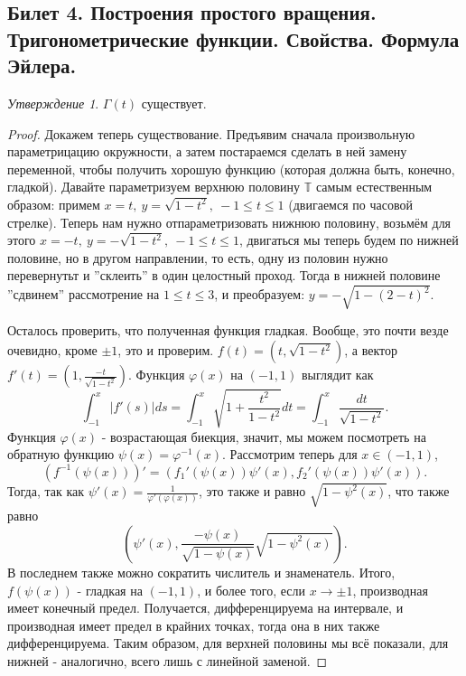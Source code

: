 \documentclass[a4paper]{article}
\theoremstyle{indented}
\theoremstyle{definition}
\theoremstyle{remark}
\newtheorem{stat}{Утверждение}
\begin{document}
\subsection{Билет 4. Построения простого вращения. Тригонометрические функции. Свойства. Формула Эйлера.}


\begin{stat}
     $\Gamma(t)$ существует.
\end{stat}

\begin{proof}
    Докажем теперь существование. Предъявим сначала произвольную параметрицацию окружности, а затем постараемся сделать в ней замену переменной, чтобы получить хорошую функцию (которая должна быть, конечно, гладкой). Давайте параметризуем верхнюю половину $\mathbb{T}$ самым естественным образом: примем $x=t, \: y=\sqrt{1-t^2}, \ -1\leq t\leq 1$ (двигаемся по часовой стрелке). Теперь нам нужно отпараметризовать нижнюю половину, возьмём для этого $x=-t, \: y=-\sqrt{1-t^2}, \: -1\leq t\leq 1$, двигаться мы теперь будем по нижней половине, но в другом направлении, то есть, одну из половин нужно перевернутьт и ''склеить'' в один целостный проход. Тогда в нижней половине ''сдвинем'' рассмотрение на $1\leq t\leq 3$, и преобразуем: $y=-\sqrt{1-(2-t)^2}$. \ 

    Осталось проверить, что полученная функция гладкая. Вообще, это почти везде очевидно, кроме $\pm 1$, это и проверим. $f(t)=(t, \sqrt{1-t^2})$, а вектор $f'(t)=(1, \frac{-t}{\sqrt{1-t^2}})$. Функция $\varphi(x)$ на $(-1, 1)$ выглядит как
    \[
        \int_{-1}^x|f'(s)|ds=\int_{-1}^x\sqrt{1+\frac{t^2}{1-t^2}}dt=\int_{-1}^x\frac{dt}{\sqrt{1-t^2}}.
    \]
    Функция $\varphi(x)$ - возрастающая биекция, значит, мы можем посмотреть на обратную функцию $\psi(x)=\varphi^{-1}(x)$. Рассмотрим теперь для $x\in(-1, 1)$,
    \[
         (f^{-1}(\psi(x)))'=(f_1'(\psi(x))\psi'(x), f_2'(\psi(x))\psi'(x)).
    \]
    Тогда, так как $\psi'(x)=\frac{1}{\varphi'(\varphi(x))}$, это также и равно $\sqrt{1-\psi^2(x)}$, что также равно 
    \[
    (\psi'(x), \frac{-\psi(x)}{\sqrt{1-\psi(x)}}\sqrt{1-\psi^2(x)}).
    \]
    В последнем также можно сократить числитель и знаменатель. Итого, $f(\psi(x))$ - гладкая на $(-1, 1)$, и более того, если $x\rightarrow\pm 1$, производная имеет конечный предел. Получается, дифференцируема на интервале, и производная имеет предел в крайних точках, тогда она в них также дифференцируема. Таким образом, для верхней половины мы всё показали, для нижней - аналогично, всего лишь с линейной заменой. 
\end{proof}
\end{document}
